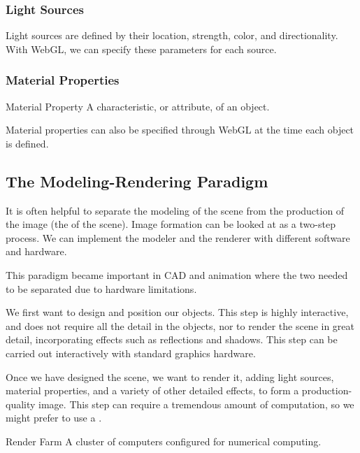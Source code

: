 \documentclass[../COS3712_Notes.tex]{subfiles}
\begin{document}
        \subsubsection{Light Sources}
          Light sources are defined by their location, strength, color, and directionality.
          With WebGL, we can specify these parameters for each source.

        \subsubsection{Material Properties}
          \begin{definition}{Material Property}
            A characteristic, or attribute, of an object.
          \end{definition}

          Material properties can also be specified through WebGL
          at the time each object is defined.

      \subsection{The Modeling-Rendering Paradigm}
        It is often helpful to separate the modeling of the scene
        from the production of the image
        (the  of the scene).
        Image formation can be looked at as a two-step process.
        We can implement the modeler and the renderer with different software and hardware.

        This paradigm became important in CAD and animation where
        the two needed to be separated due to hardware limitations.

        \begin{example}
          We first want to design and position our objects.
          This step is highly interactive, and does not require all the detail in the objects,
          nor to render the scene in great detail,
          incorporating effects such as reflections and shadows.
          This step can be carried out interactively with standard graphics hardware.

          Once we have designed the scene, we want to render it,
          adding light sources, material properties, and a variety of other detailed effects,
          to form a production-quality image.
          This step can require a tremendous amount of computation,
          so we might prefer to use a .

          \begin{definition}{Render Farm}
            A cluster of computers configured for numerical computing.
          \end{definition}
        \end{example}
\end{document}

